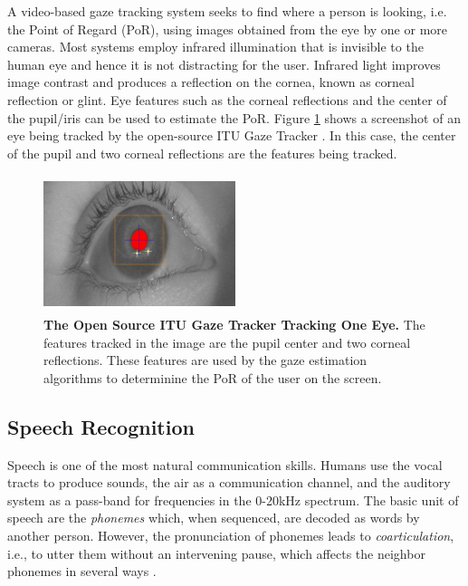 \documentclass[]{article}
\begin{document}
A video-based gaze tracking system seeks to find where a person is looking, i.e. the Point of Regard (PoR), using images
obtained from the eye by one or more cameras. Most systems employ infrared illumination that is invisible to the human
eye and hence it is not distracting for the user. Infrared light improves image contrast and produces a reflection on
the cornea, known as corneal reflection or glint. Eye features such as the corneal reflections and the center of the
pupil/iris can be used to estimate the PoR. Figure \ref{screenGazeTracker} shows a screenshot of an eye being tracked by
the open-source ITU Gaze Tracker \cite{lowcostitugazetracker,Rozado2012}. In this case, the center of the pupil and two
corneal reflections are the features being tracked.


\begin{figure}[ht]
\begin{center}
\includegraphics[width=0.5\textwidth, height=40mm]{figures/screenGazeTracker.jpg}
\vspace{-3mm}
\end{center}
\caption{\textbf{The Open Source ITU Gaze Tracker Tracking One Eye.} The
features tracked in the image are the pupil center and two corneal reflections. These features are used by the gaze 
estimation algorithms to determinine the PoR of the user on the screen.}
\label{screenGazeTracker}
\end{figure}


\subsection{Speech Recognition}
Speech is one of the most natural communication skills. Humans use the vocal tracts to produce sounds, the air as a
communication channel, and the auditory system as a pass-band for frequencies in the 0-20kHz spectrum. The basic unit of
speech are the \textit{phonemes} which, when sequenced, are decoded as words by another person. However, the
pronunciation of phonemes leads to \textit{coarticulation}, i.e., to utter them without an intervening pause, which
affects the neighbor phonemes in several ways \cite{Douglas2008}.
\end{document}

